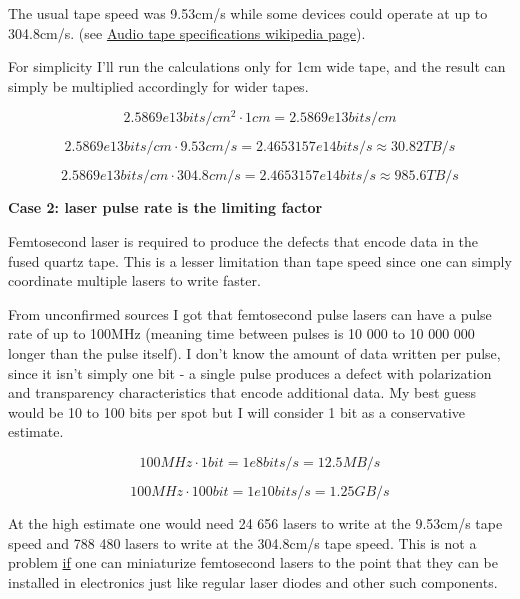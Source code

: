 \documentclass[a4paper]{article}
\begin{document}
	\medskip
	
	The usual tape speed was 9.53cm/s while some devices could operate at up to 304.8cm/s. (see \href{https://en.wikipedia.org/wiki/Audio_tape_specifications#Tape_speeds}{Audio tape specifications wikipedia page}).
	
	\medskip
	
	For simplicity I'll run the calculations only for 1cm wide tape, and the result can simply be multiplied accordingly for wider tapes.
	
	$$ 2.5869e13bits/cm^2 \cdot 1cm = 2.5869e13 bits/cm $$
	
	$$ 2.5869e13 bits/cm \cdot  9.53cm/s = 2.4653157e14bits/s \approx 30.82TB/s $$
	
	$$ 2.5869e13 bits/cm \cdot  304.8cm/s = 2.4653157e14bits/s \approx 985.6TB/s $$
	
	\medskip
	
	\begin{center}
		\textbf{Case 2: laser pulse rate is the limiting factor}
	\end{center}
	
	\medskip
	
	Femtosecond laser is required to produce the defects that encode data in the fused quartz tape. This is a lesser limitation than tape speed since one can simply coordinate multiple lasers to write faster.
	
	\medskip
	
	From unconfirmed sources I got that femtosecond pulse lasers can have a pulse rate of up to 100MHz (meaning time between pulses is 10 000 to 10 000 000 longer than the pulse itself). I don't know the amount of data written per pulse, since it isn't simply one bit - a single pulse produces a defect with polarization and transparency characteristics that encode additional data. My best guess would be 10 to 100 bits per spot but I will consider 1 bit as a conservative estimate.
	
	\medskip
	
	$$ 100MHz \cdot 1bit = 1e8bits/s = 	12.5MB/s $$
	
	$$ 100MHz \cdot 100bit = 1e10bits/s = 1.25GB/s $$
	
	\medskip
	
	At the high estimate one would need 24 656 lasers to write at the 9.53cm/s tape speed and 788 480 lasers to write at the 304.8cm/s tape speed. This is not a problem \underline{if} one can miniaturize femtosecond lasers to the point that they can be installed in electronics just like regular laser diodes and other such components.
	
\end{document}
